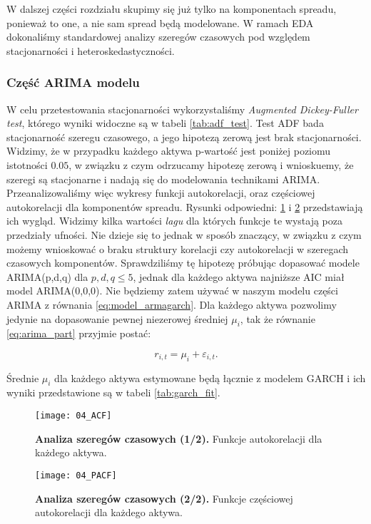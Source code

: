 W dalszej części rozdziału skupimy się już tylko na komponentach spreadu, ponieważ to one, a nie sam spread będą modelowane. W ramach EDA dokonaliśmy standardowej analizy szeregów czasowych pod względem stacjonarności i heteroskedastyczności. 

\subsubsection{Część ARIMA modelu}
W celu przetestowania stacjonarności wykorzystaliśmy \emph{Augmented Dickey-Fuller test}, którego wyniki widoczne są w tabeli \ref{tab:adf_test}. Test ADF bada stacjonarność szeregu czasowego, a jego hipotezą zerową jest brak stacjonarności. Widzimy, że w przypadku każdego aktywa p-wartość jest poniżej poziomu istotności $0.05$, w związku z czym odrzucamy hipotezę zerową i wnioskuemy, że szeregi są stacjonarne i nadają się do modelowania technikami ARIMA.\\

Przeanalizowaliśmy więc wykresy funkcji autokorelacji, oraz częściowej autokorelacji dla komponentów spreadu. Rysunki odpowiedni: \ref{fig:acf} i \ref{fig:pacf} przedstawiają ich wygląd. Widzimy kilka wartości \emph{lagu} dla których funkcje te wystają poza przedziały ufności. Nie dzieje się to jednak w sposób znaczący, w związku z czym możemy wnioskować o braku struktury korelacji czy autokorelacji w szeregach czasowych komponentów. Sprawdziliśmy tę hipotezę próbując dopasować modele ARIMA(p,d,q) dla $p,d,q \leqslant 5$, jednak dla każdego aktywa najniższe AIC miał model ARIMA(0,0,0). Nie będziemy zatem używać w naszym modelu części ARIMA z równania \ref{eq:model_armagarch}. Dla każdego aktywa pozwolimy jedynie na dopasowanie pewnej niezerowej średniej $\mu_i$, tak że równanie \ref{eq:arima_part}
przyjmie postać:

$$ r_{i, t} = \mu_i + \varepsilon_{i, t}.$$

Średnie $\mu_i$ dla każdego aktywa estymowane będą łącznie z modelem GARCH i ich wyniki przedstawione są w tabeli \ref{tab:garch_fit}.

\begin{figure}[h]
	\centering
	\texttt{[image: 04\_ACF]}
	\caption{\textbf{Analiza szeregów czasowych (1/2).} Funkcje autokorelacji dla każdego aktywa. \label{fig:acf}}
\end{figure}

\begin{figure}[h]
	\centering
	\texttt{[image: 04\_PACF]}
	\caption{\textbf{Analiza szeregów czasowych (2/2).} Funkcje częściowej autokorelacji dla każdego aktywa. \label{fig:pacf}}
\end{figure}


